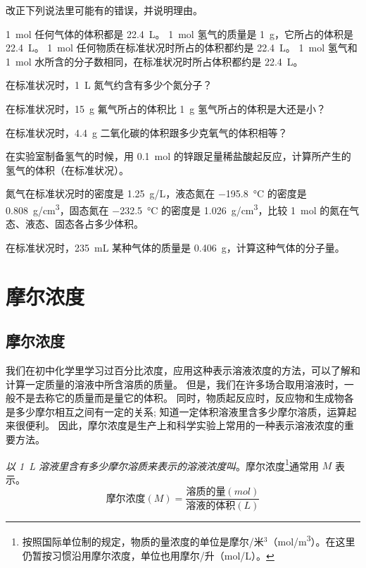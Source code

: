 \begin{Practice}[习题]
  \begin{question}
    \item 改正下列说法里可能有的错误，并说明理由。
    \begin{tasks}
      \task \qty{1}{mol} 任何气体的体积都是 \qty{22.4}{L}。
      \task \qty{1}{mol} 氢气的质量是 \qty{1}{g}，它所占的体积是 \qty{22.4}{L}。
      \task \qty{1}{mol} 任何物质在标准状况时所占的体积都约是 \qty{22.4}{L}。
      \task \qty{1}{mol} 氢气和 \qty{1}{mol} 水所含的分子数相同，在标准状况时所占体积都约是 \qty{22.4}{L}。
    \end{tasks}
    \item 在标准状况时，\qty{1}{L} 氮气约含有多少个氮分子？
    \item 在标准状况时，\qty{15}{g} 氟气所占的体积比 \qty{1}{g} 氢气所占的体积是大还是小？
    \item 在标准状况时，\qty{4.4}{g} 二氧化碳的体积跟多少克氧气的体积相等？
    \item 在实验室制备氢气的时候，用 \qty{0.1}{mol} 的锌跟足量稀盐酸起反应，计算所产生的氢气的体积（在标准状况）。
    \item 氮气在标准状况时的密度是 \qty{1.25}{g/L}，液态氮在 \qty{-195.8}{\celsius} 的密度是 \qty{0.808}{g/cm^3}，固态氮在  \qty{-232.5}{\celsius} 的密度是 \qty{1.026}{g/cm^3}，比较 \qty{1}{mol} 的氮在气态、液态、固态各占多少体积。
    \item 在标准状况时，\qty{235}{mL} 某种气体的质量是 \qty{0.406}{g}，计算这种气体的分子量。
  \end{question}
\end{Practice}

\section{摩尔浓度}
\subsection{摩尔浓度}
我们在初中化学里学习过百分比浓度，应用这种表示溶液浓度的方法，可以了解和计算一定质量的溶液中所含溶质的质量。
但是，我们在许多场合取用溶液时，一般不是去称它的质量而是量它的体积。
同时，物质起反应时，反应物和生成物各是多少摩尔相互之间有一定的关系; 知道一定体积溶液里含多少摩尔溶质，运算起来很便利。
因此，摩尔浓度是生产上和科学实验上常用的一种表示溶液浓度的重要方法。

\emph{以 \qty{1}{L} 溶液里含有多少摩尔溶质来表示的溶液浓度叫}。摩尔浓度\footnote{按照国际单位制的规定，物质的量浓度的单位是摩尔/米$^3$（\unit{mol/m^3}）。在这里仍暂按习惯沿用摩尔浓度，单位也用摩尔/升（\unit{mol/L}）。}通常用 $M$ 表示。
\[
\text{摩尔浓度}(M) = \frac{\text{溶质的量}(\unit{mol})}{\text{溶液的体积}(\unit{L})}
\]

